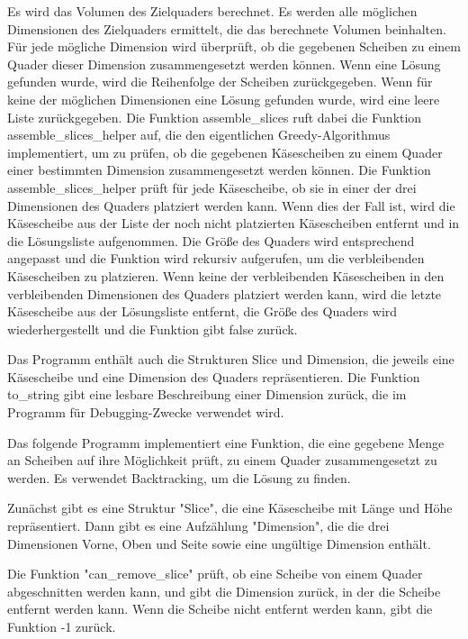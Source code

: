 \documentclass[a4paper,10pt,ngerman]{scrartcl}
\begin{document}
    Es wird das Volumen des Zielquaders berechnet.
    Es werden alle möglichen Dimensionen des Zielquaders ermittelt, die das berechnete Volumen beinhalten.
    Für jede mögliche Dimension wird überprüft, ob die gegebenen Scheiben zu einem Quader dieser Dimension zusammengesetzt werden können.
    Wenn eine Lösung gefunden wurde, wird die Reihenfolge der Scheiben zurückgegeben.
    Wenn für keine der möglichen Dimensionen eine Lösung gefunden wurde, wird eine leere Liste zurückgegeben.
    Die Funktion assemble\_slices ruft dabei die Funktion assemble\_slices\_helper auf, die den eigentlichen Greedy-Algorithmus implementiert,
    um zu prüfen, ob die gegebenen Käsescheiben zu einem Quader einer bestimmten Dimension zusammengesetzt werden können.
    Die Funktion assemble\_slices\_helper prüft für jede Käsescheibe, ob sie in einer der drei Dimensionen des Quaders platziert werden kann.
    Wenn dies der Fall ist, wird die Käsescheibe aus der Liste der noch nicht platzierten Käsescheiben entfernt und in die Lösungsliste aufgenommen.
    Die Größe des Quaders wird entsprechend angepasst und die Funktion wird rekursiv aufgerufen, um die verbleibenden Käsescheiben zu platzieren.
    Wenn keine der verbleibenden Käsescheiben in den verbleibenden Dimensionen des Quaders platziert werden kann, wird die letzte Käsescheibe aus der Lösungsliste entfernt, die Größe des Quaders wird wiederhergestellt und die Funktion gibt false zurück.

    Das Programm enthält auch die Strukturen Slice und Dimension, die jeweils eine Käsescheibe und eine Dimension des Quaders repräsentieren.
    Die Funktion to\_string gibt eine lesbare Beschreibung einer Dimension zurück, die im Programm für Debugging-Zwecke verwendet wird.

    Das folgende Programm implementiert eine Funktion, die eine gegebene Menge an Scheiben auf ihre Möglichkeit prüft, zu einem Quader zusammengesetzt zu werden.
    Es verwendet Backtracking, um die Lösung zu finden.

    Zunächst gibt es eine Struktur "Slice", die eine Käsescheibe mit Länge und Höhe repräsentiert.
    Dann gibt es eine Aufzählung "Dimension", die die drei Dimensionen Vorne, Oben und Seite sowie eine ungültige Dimension enthält.

    Die Funktion "can\_remove\_slice" prüft, ob eine Scheibe von einem Quader abgeschnitten werden kann, und gibt die Dimension zurück, in der die Scheibe entfernt werden kann.
    Wenn die Scheibe nicht entfernt werden kann, gibt die Funktion -1 zurück.
\end{document}
